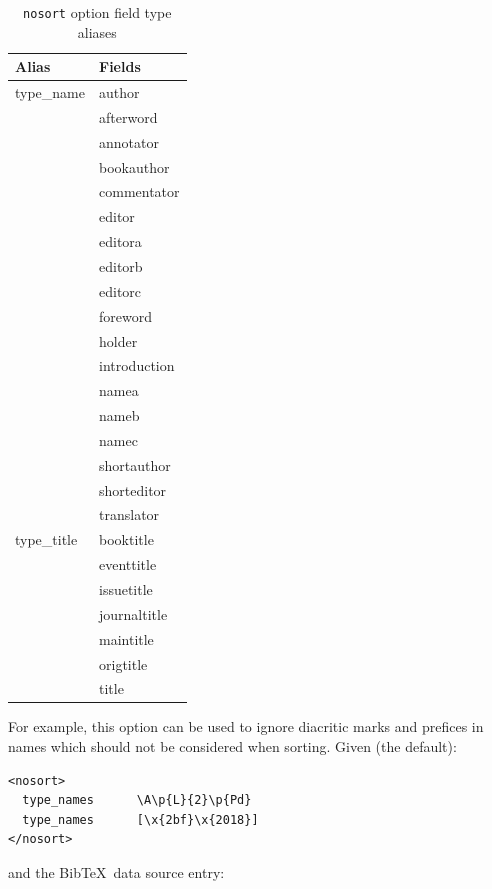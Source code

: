 \documentclass{ltxdockit}
\begin{document}
\begin{table}
\begin{center}
\small
\begin{tabular}{ll}
\toprule
Alias & Fields\\
\midrule
type\_name & author\\
          & afterword\\
          & annotator\\
          & bookauthor\\
          & commentator\\
          & editor\\
          & editora\\
          & editorb\\
          & editorc\\
          & foreword\\
          & holder\\
          & introduction\\
          & namea\\
          & nameb\\
          & namec\\
          & shortauthor\\
          & shorteditor\\
          & translator\\
type\_title & booktitle\\
           & eventtitle\\
           & issuetitle\\
           & journaltitle\\
           & maintitle\\
           & origtitle\\
           & title\\
\bottomrule
\end{tabular}
\end{center}
\caption{\texttt{nosort} option field type aliases}
\label{tab:nst}
\end{table}

For example, this option can be used to ignore diacritic marks and prefices
in names which should not be considered when sorting. Given (the default):

\begin{verbatim}
<nosort>
  type_names      \A\p{L}{2}\p{Pd}
  type_names      [\x{2bf}\x{2018}]
</nosort>
\end{verbatim}

\noindent and the Bib\TeX\ data source entry:
\end{document}
